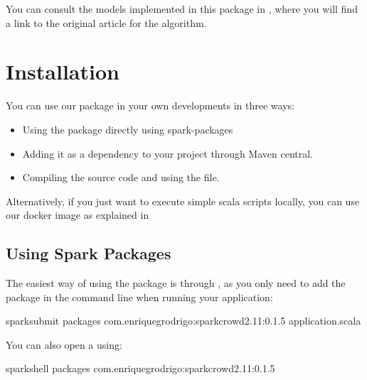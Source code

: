 \documentclass[letterpaper,10pt,english]{sphinxmanual}
\begin{document}
You can consult the models implemented in this package in {\hyperref[\detokenize{package/methods:methods}]{}}, where you will find a link to the
original article for the algorithm.


\chapter{Installation}
\label{\detokenize{usage/installation:installation}}\label{\detokenize{usage/installation:id1}}\label{\detokenize{usage/installation::doc}}
You can use our package in your own developments in three ways:
\begin{itemize}
\item {} 
Using the package directly using spark-packages

\item {} 
Adding it as a dependency to your project through Maven central.

\item {} 
Compiling the source code and using the  file.

\end{itemize}

Alternatively, if you just want to execute simple scala scripts locally,
you can use our docker image as explained in {\hyperref[\detokenize{usage/quickstart:quickstart}]{}}


\section{Using Spark Packages}
\label{\detokenize{usage/installation:using-spark-packages}}
The easiest way of using the package is through , as you only need to add the package in the command line when running your
application:

%
\begin{sphinxVerbatim}[commandchars=\\\{\}]
spark\PYGZhy{}submit \PYGZhy{}\PYGZhy{}packages com.enriquegrodrigo:spark\PYGZhy{}crowd\PYGZus{}2.11:0.1.5 application.scala
\end{sphinxVerbatim}

You can also open a  using:

%
\begin{sphinxVerbatim}[commandchars=\\\{\}]
spark\PYGZhy{}shell \PYGZhy{}\PYGZhy{}packages com.enriquegrodrigo:spark\PYGZhy{}crowd\PYGZus{}2.11:0.1.5
\end{sphinxVerbatim}
\end{document}
